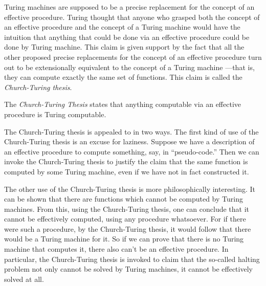\documentclass[../../../include/open-logic-section]{subfiles}
\begin{document}

Turing machines are supposed to be a precise replacement for the
concept of an effective procedure. Turing thought that anyone who
grasped both the concept of an effective procedure and the concept
of a Turing machine would have the intuition that anything that could
be done via an effective procedure could be done by Turing machine.
This claim is given support by the fact that all the other proposed
precise replacements for the concept of an effective procedure turn
out to be extensionally equivalent to the concept of a Turing machine
---that is, they can compute exactly the same set of functions. This
claim is called the \emph{Church-Turing thesis}.

\begin{defn}
The \emph{Church-Turing Thesis} states that anything computable via 
an effective procedure is Turing computable.
\end{defn}

The Church-Turing thesis is appealed to in two ways.  The first kind
of use of the Church-Turing thesis is an excuse for laziness.  Suppose
we have a description of an effective procedure to compute something,
say, in ``pseudo-code.''  Then we can invoke the Church-Turing thesis
to justify the claim that the same function is computed by some Turing
machine, even if we have not in fact constructed it.

The other use of the Church-Turing thesis is more philosophically
interesting.  It can be shown that there are functions which cannot be
computed by Turing machines.  From this, using the Church-Turing
thesis, one can conclude that it cannot be effectively computed, using
any procedure whatsoever.  For if there were such a procedure, by the
Church-Turing thesis, it would follow that there would be a Turing
machine for it.  So if we can prove that there is no Turing machine
that computes it, there also can't be an effective procedure.  In
particular, the Church-Turing thesis is invoked to claim that the
so-called halting problem not only cannot be solved by Turing
machines, it cannot be effectively solved at all.
\end{document}
